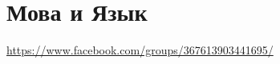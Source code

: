  
 
 
 
 
\chapter{Мова и Язык}











\url{https://www.facebook.com/groups/367613903441695/}


